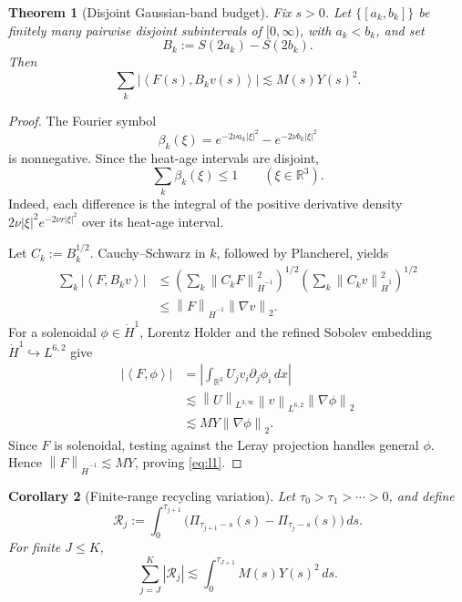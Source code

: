 \documentclass[11pt]{article}
\newtheorem{theorem}{Theorem}
\newtheorem{corollary}[theorem]{Corollary}
\theoremstyle{remark}
\newcommand{\R}{\mathbb R}
\newcommand{\norm}[1]{\left\|#1\right\|}
\newcommand{\ip}[2]{\left\langle #1,#2\right\rangle}
\begin{document}
\begin{theorem}[Disjoint Gaussian-band budget]
\label{thm:l1}
Fix \(s>0\).  Let \(\{[a_k,b_k]\}\) be finitely many pairwise disjoint
subintervals of \([0,\infty)\), with \(a_k<b_k\), and set
\[
 B_k:=S(2a_k)-S(2b_k).
\]
Then
\begin{equation}
\label{eq:l1}
 \boxed{
 \sum_k\left|\ip{F(s)}{B_kv(s)}\right|
 \lesssim M(s)Y(s)^2.
 }
\end{equation}
\end{theorem}

\begin{proof}
The Fourier symbol
\[
 \beta_k(\xi)
 =
 e^{-2\nu a_k|\xi|^2}
 -e^{-2\nu b_k|\xi|^2}
\]
is nonnegative.  Since the heat-age intervals are disjoint,
\[
 \sum_k\beta_k(\xi)\leq1
 \qquad(\xi\in\R^3).
\]
Indeed, each difference is the integral of the positive derivative
density \(2\nu|\xi|^2e^{-2\nu r|\xi|^2}\) over its heat-age interval.

Let \(C_k:=B_k^{1/2}\).  Cauchy--Schwarz in \(k\), followed by
Plancherel, yields
\[
\begin{aligned}
 \sum_k|\ip{F}{B_kv}|
 &\leq
 \left(\sum_k\norm{C_kF}_{\dot H^{-1}}^2\right)^{1/2}
 \left(\sum_k\norm{C_kv}_{\dot H^1}^2\right)^{1/2}\\
 &\leq\norm{F}_{\dot H^{-1}}\norm{\nabla v}_2.
\end{aligned}
\]
For a solenoidal \(\phi\in\dot H^1\), Lorentz Holder and the refined
Sobolev embedding \(\dot H^1\hookrightarrow L^{6,2}\) give
\[
\begin{aligned}
 |\ip{F}{\phi}|
 &=\left|\int_{\R^3}U_jv_i\partial_j\phi_i\,dx\right|\\
 &\lesssim
 \norm{U}_{L^{3,\infty}}\norm{v}_{L^{6,2}}
 \norm{\nabla\phi}_2\\
 &\lesssim M Y\norm{\nabla\phi}_2.
\end{aligned}
\]
Since \(F\) is solenoidal, testing against the Leray projection handles
general \(\phi\).  Hence
\(\norm{F}_{\dot H^{-1}}\lesssim MY\), proving
\eqref{eq:l1}.
\end{proof}

\begin{corollary}[Finite-range recycling variation]
\label{cor:variation}
Let
\(\tau_0>\tau_1>\cdots>0\), and define
\[
 \mathcal R_j:=
 \int_0^{\tau_{j+1}}
 \bigl(\Pi_{\tau_{j+1}-s}(s)
       -\Pi_{\tau_j-s}(s)\bigr)\,ds.
\]
For finite \(J\leq K\),
\begin{equation}
\label{eq:recycling-variation}
 \boxed{
 \sum_{j=J}^K|\mathcal R_j|
 \lesssim
 \int_0^{\tau_{J+1}}M(s)Y(s)^2\,ds.
 }
\end{equation}
\end{corollary}
\end{document}

